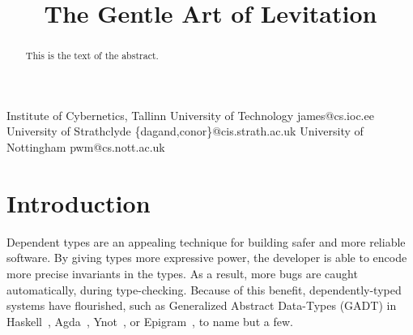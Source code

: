 \documentclass[preprint
              , authoryear
              ]{sigplanconf}
\begin{document}
\ColourEpigram







\title{The Gentle Art of Levitation}


           {Institute of Cybernetics, Tallinn University of Technology}
           {james@cs.ioc.ee}
           {University of Strathclyde}
           {\{dagand,conor\}@cis.strath.ac.uk}
           {University of Nottingham}
           {pwm@cs.nott.ac.uk}


\maketitle




\begin{abstract}
This is the text of the abstract.
\end{abstract}









\section{Introduction}

Dependent types are an appealing technique for building safer and more
reliable software. By giving types more expressive power, the
developer is able to encode more precise invariants in the types. As a
result, more bugs are caught automatically, during
type-checking. Because of this benefit, dependently-typed systems have
flourished, such as Generalized Abstract Data-Types (GADT) in
Haskell~\cite{spj:gadt}, Agda~\cite{norell:agda},
Ynot~\cite{morrisett:ynot}, or Epigram~\cite{pigs:epigram}, to name
but a few.
\end{document}
